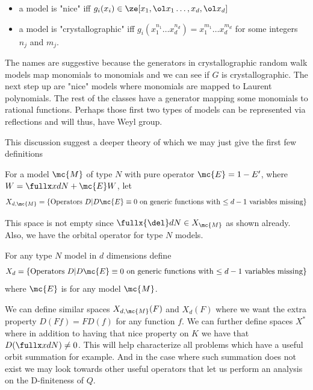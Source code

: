 \begin{itemize}
\item a model is "nice" iff $g_i(x_i) \in \ze[x_1,\ol x_1\ldots,x_d,\ol x_d]$
\item a model is "crystallographic" iff $g_i(x_1^{n_1}\ldots x_d^{n_d}) = x_1^{m_1}\ldots x_d^{m_d}$ for some integers $n_j$ and $m_j$.
\end{itemize}
The names are suggestive because the generators in crystallographic random walk models map monomials to monomials and we can see if $G$ is crystallographic. The next step up are "nice" models where monomials are mapped to Laurent polynomials. The rest of the classes have a generator mapping some monomials to rational functions. Perhaps those first two types of models can be represented via reflections and will thus, have Weyl group.




This discussion suggest a deeper theory of which we may just give the first few definitions
\begin{definition} For a model $\mc{M}$ of type $N$ with pure operator $\mc{E} = 1- E'$, where $W = \fullx xdN  +\mc{E}W$, let
\begin{align}
	X_{d,\mc{M}} = \{\text{Operators $D$}| D\mc{E} \equiv 0 \text{ on generic functions with $\leq d -1$ variables missing}\}
\end{align}
\end{definition}
This space is not empty since $\fullx{\del} dN \in X_{\mc{M}}$ as shown already. Also, we have the orbital operator for type $N$ models.
\begin{definition} For any type $N$ model in $d$ dimensions define
\begin{align}
	X_d  = \{\text{Operators $D$}| D\mc{E} \equiv 0 \text{ on generic functions with $\leq d -1$ variables missing}\}
\end{align}
where $\mc{E}$ is for any model $\mc{M}$.
\end{definition}
We can define similar spaces $X_{d,\mc{M}}(F)$ and $X_d(F)$ where we want the extra property $D(Ff) = FD(f)$ for any function $f$. We can further define spaces $X^\ast$ where in addition to having that nice property on $K$ we have that $D(\fullx xdN) \neq 0$. This will help characterize all problems which have a useful orbit summation for example. And in the case where such summation does not exist we may look towards other useful operators that let us perform an analysis on the D-finiteness of $Q$.

